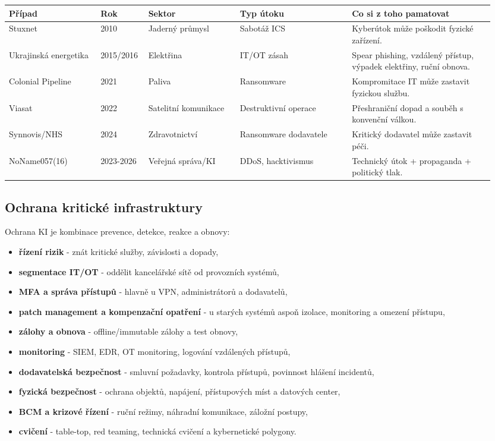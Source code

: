 \begin{longtable}{p{0.18\linewidth}p{0.09\linewidth}p{0.18\linewidth}p{0.22\linewidth}p{0.28\linewidth}}
\toprule
\textbf{Případ} & \textbf{Rok} & \textbf{Sektor} & \textbf{Typ útoku} & \textbf{Co si z toho pamatovat}\\
\midrule
Stuxnet & 2010 & Jaderný průmysl & Sabotáž ICS & Kyberútok může poškodit fyzické zařízení.\\
Ukrajinská energetika & 2015/2016 & Elektřina & IT/OT zásah & Spear phishing, vzdálený přístup, výpadek elektřiny, ruční obnova.\\
Colonial Pipeline & 2021 & Paliva & Ransomware & Kompromitace IT může zastavit fyzickou službu.\\
Viasat & 2022 & Satelitní komunikace & Destruktivní operace & Přeshraniční dopad a souběh s konvenční válkou.\\
Synnovis/NHS & 2024 & Zdravotnictví & Ransomware dodavatele & Kritický dodavatel může zastavit péči.\\
NoName057(16) & 2023-2026 & Veřejná správa/KI & DDoS, hacktivismus & Technický útok + propaganda + politický tlak.\\
\bottomrule
\end{longtable}

\subsection*{Ochrana kritické infrastruktury}
Ochrana KI je kombinace prevence, detekce, reakce a obnovy:
\begin{itemize}
  \item \textbf{řízení rizik} - znát kritické služby, závislosti a dopady,
  \item \textbf{segmentace IT/OT} - oddělit kancelářské sítě od provozních systémů,
  \item \textbf{MFA a správa přístupů} - hlavně u VPN, administrátorů a dodavatelů,
  \item \textbf{patch management a kompenzační opatření} - u starých systémů aspoň izolace, monitoring a omezení přístupu,
  \item \textbf{zálohy a obnova} - offline/immutable zálohy a test obnovy,
  \item \textbf{monitoring} - SIEM, EDR, OT monitoring, logování vzdálených přístupů,
  \item \textbf{dodavatelská bezpečnost} - smluvní požadavky, kontrola přístupů, povinnost hlášení incidentů,
  \item \textbf{fyzická bezpečnost} - ochrana objektů, napájení, přístupových míst a datových center,
  \item \textbf{BCM a krizové řízení} - ruční režimy, náhradní komunikace, záložní postupy,
  \item \textbf{cvičení} - table-top, red teaming, technická cvičení a kybernetické polygony.
\end{itemize}

